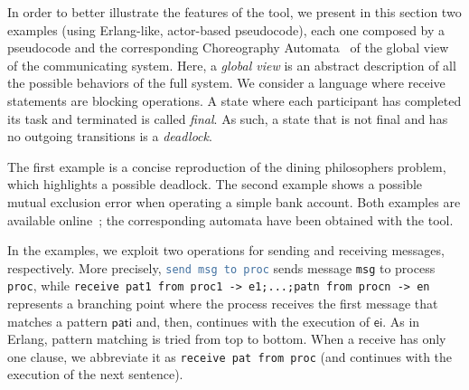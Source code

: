 In order to better illustrate the features of the tool, we present in
this section two examples (using Erlang-like, actor-based pseudocode), each one
composed by a pseudocode and the corresponding Choreography
Automata~\cite{coordination2020-chorAuto} of the global view of the
communicating system. Here, a \emph{global view} is an abstract description of
all the possible behaviors of the full system. We consider a language
where receive statements are blocking operations. A state where each
participant has completed its task and terminated is called \emph{final}. As such, a
state that is not final and has no outgoing transitions is a \emph{deadlock}.

The first example is a concise reproduction of the dining philosophers
problem, which highlights a possible deadlock. The second example
shows a possible mutual exclusion error when operating a simple bank account.
Both examples are available online~\cite{chorer_examples}; the
corresponding automata have been obtained with the tool.


In the examples, we exploit two operations for sending and receiving messages,
respectively.
%
More precisely, \lstinline[language=erlang, morekeywords={send,
  to}]{send msg to proc} sends message \lstinline{msg} to process
\lstinline{proc}, while \lstinline[morekeywords={receive,
  from}]{receive pat1 from proc1 -> e1;...;patn from procn -> en} 
  represents a branching point where the process receives 
  the first message 
  that matches a pattern $\mathsf{pati}$ and, then, 
  continues with the execution of $\mathsf{ei}$. 
  As in Erlang, 
pattern matching is tried from top to bottom.
When a receive has only one clause, we abbreviate it as
\lstinline[morekeywords={receive,from}]{receive pat from proc}
(and continues with the execution of the next sentence).